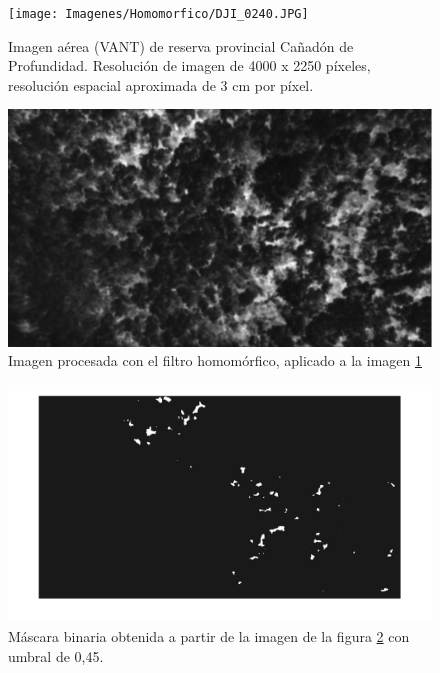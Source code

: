 \begin{figure}[h!]
    \texttt{[image: Imagenes/Homomorfico/DJI\_0240.JPG]}
     \hfill
     \caption{Imagen aérea (VANT) de reserva provincial Cañadón de Profundidad. Resolución de imagen de 4000 x 2250 píxeles, resolución espacial aproximada de  3 cm por píxel.}
    \label{Cañadon_homo}
\end{figure}

\begin{figure}[h!]
    \includegraphics[width=\textwidth]{Imagenes/Homomorfico/dji_240_filter.png}
     \hfill
     \caption{Imagen procesada con el filtro homomórfico, aplicado a la imagen \ref{Cañadon_homo}}
    \label{Cañadon_filtrada}
\end{figure}

\begin{figure}[h!]
    \includegraphics[width=\textwidth]{Imagenes/Homomorfico/DJI_240_bin.png}
     \hfill
     \caption{Máscara binaria obtenida a partir de la imagen de la figura \ref{Cañadon_filtrada} con umbral de 0,45.}
    \label{binariaCañadon}
\end{figure}

